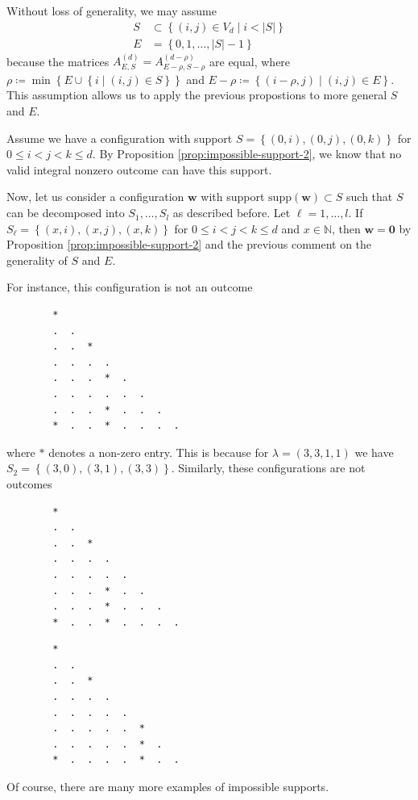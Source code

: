 \begin{remark}\label{rem:generality-jfknwejn}
    Without loss of generality, we may assume
\begin{align*}
    S &\subset \left\{ (i,j) \in V_d \mid i < \lvert S \rvert \right\}\\
    E &= \left\{ 0,1, \dots, \lvert S \rvert - 1 \right\}
\end{align*}
because the matrices \( A^{(d)}_{E,S} = A^{(d-\rho)}_{E - \rho, S - \rho} \) are equal, where \( \rho \coloneqq \min \left\{ E \cup \left\{ i \mid (i,j) \in S \right\} \right\} \) and \( E - \rho \coloneqq \left\{ (i - \rho, j) \mid (i,j) \in E \right\} \). This assumption allows us to apply the previous propostions to more general \( S \) and \( E \).
\end{remark}

\begin{example}
    Assume we have a configuration with support \( S = \left\{ (0,i), (0,j), (0,k) \right\} \) for \( 0 \leq i < j< k \leq d \). By Proposition \ref{prop:impossible-support-2}, we know that no valid integral nonzero outcome can have this support.

    Now, let us consider a configuration \( \mathbf{w} \) with support \( \mathrm{supp}(\mathbf{w}) \subset S \) such that \( S \) can be decomposed into \( S_1, \dots, S_l \) as described before. Let \( \ell = 1, \dots, l \). If \( S_\ell = \left\{ (x,i), (x,j), (x,k) \right\} \) for \( 0 \leq i < j< k \leq d \) and \( x \in \mathbb{N} \), then \( \mathbf{w} = \mathbf 0 \) by Proposition \ref{prop:impossible-support-2} and the previous comment on the generality of \( S \) and \( E \). 

    For instance, this configuration is not an outcome
    \begin{verbatim}
        *
        .  .
        .  .  *  
        .  .  .  .  
        .  .  .  *  .  
        .  .  .  .  .  .  
        .  .  .  *  .  .  .  
        *  .  .  *  .  .  .  .  
    \end{verbatim}
    where \( * \) denotes a non-zero entry. This is because for \( \lambda = (3,3,1,1) \) we have \( S_2 = \left\{ (3,0), (3,1), (3,3) \right\} \). Similarly, these configurations are not outcomes
    \begin{verbatim}
        *
        .  .
        .  .  *  
        .  .  .  .  
        .  .  .  .  .  
        .  .  .  *  .  .  
        .  .  .  *  .  .  .  
        *  .  .  *  .  .  .  .  
    \end{verbatim}
    \begin{verbatim}
        *
        .  .
        .  .  *  
        .  .  .  .  
        .  .  .  .  .  
        .  .  .  .  .  *  
        .  .  .  .  .  *  .  
        *  .  .  .  .  *  .  .  
    \end{verbatim}
    Of course, there are many more examples of impossible supports.
\end{example}